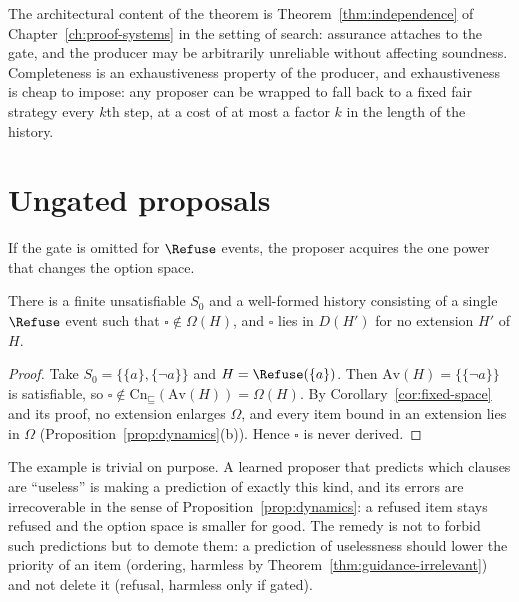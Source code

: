 The architectural content of the theorem is Theorem~\ref{thm:independence} of Chapter~\ref{ch:proof-systems} in the setting of search: assurance attaches to the gate, and the producer may be arbitrarily unreliable without affecting soundness. Completeness is an exhaustiveness property of the producer, and exhaustiveness is cheap to impose: any proposer can be wrapped to fall back to a fixed fair strategy every $k$th step, at a cost of at most a factor $k$ in the length of the history.

\section{Ungated proposals}
\label{sec:ungated}

If the gate is omitted for $\Refuse$ events, the proposer acquires the one power that changes the option space.

\begin{proposition}
\label{prop:ungated}
There is a finite unsatisfiable $S_0$ and a well-formed history consisting of a single $\Refuse$ event such that $\square\notin\Omega(H)$, and $\square$ lies in $D(H')$ for no extension $H'$ of $H$.
\end{proposition}

\begin{proof}
Take $S_0=\{\{a\},\{\neg a\}\}$ and $H=\Refuse(\{a\})$. Then $\mathrm{Av}(H)=\{\{\neg a\}\}$ is satisfiable, so $\square\notin\mathrm{Cn}_{\sqsubseteq}(\mathrm{Av}(H))=\Omega(H)$. By Corollary~\ref{cor:fixed-space} and its proof, no extension enlarges $\Omega$, and every item bound in an extension lies in $\Omega$ (Proposition~\ref{prop:dynamics}(b)). Hence $\square$ is never derived.
\end{proof}

The example is trivial on purpose. A learned proposer that predicts which clauses are ``useless'' is making a prediction of exactly this kind, and its errors are irrecoverable in the sense of Proposition~\ref{prop:dynamics}: a refused item stays refused and the option space is smaller for good. The remedy is not to forbid such predictions but to demote them: a prediction of uselessness should lower the priority of an item (ordering, harmless by Theorem~\ref{thm:guidance-irrelevant}) and not delete it (refusal, harmless only if gated).

